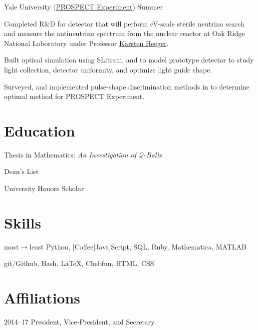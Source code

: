 \documentclass{cultvoucher}
\begin{document}
\begin{paracol}{2}
         {Yale University (\href{http://prospect.yale.edu/}{PROSPECT Experiment})}
         {Summer }
\begin{tightitemize}
	\item Completed R\&D for detector that will perform eV-scale sterile
          neutrino search and measure the antineutrino spectrum from the
          nuclear reactor at Oak Ridge National Laboratory under Professor
          \href{http://heegerlab.yale.edu/karsten-heeger}{Karsten Heeger}.
	\item Built optical simulation using SLitrani, and  to model
          prototype detector to study light collection, detector uniformity,
          and optimize light guide shape.
	\item Surveyed, and implemented pulse-shape discrimination methods in
           to determine optimal method for PROSPECT Experiment.
\end{tightitemize}


\switchcolumn


\section{Education}
\vspace{-0.9\topsep}
\begin{tightitemize}
    \item Thesis in Mathematics: \textit{An \mbox{Investigation} of
          $\mathcal{Q}$-Balls}
    \item Dean's List
    \item University Honors Scholar
\end{tightitemize}
\vspace{-2\topsep}

\section{Skills}\vspace{-0.9\topsep}
         {most$\rightarrow$least}
         {Python, [Coffee|Java]Script, SQL, Ruby, Mathematica, MATLAB}

         {}
         {git/Github, Bash, \LaTeX{}, Chebfun, HTML, CSS}

\vspace{-2\topsep}

\section{Affiliations}\vspace{-0.9\topsep}


         {2014--17}
         {President, Vice-President, and Secretary.}
\vspace{-2\topsep}

\end{paracol}
\end{document}
